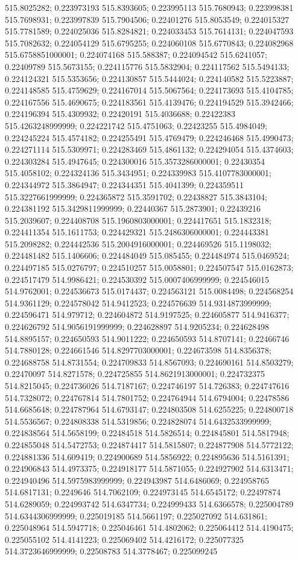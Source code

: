 515.8025282; 0.223973193 515.8393605; 0.223995113 515.7680943; 0.223998381 515.7698931; 0.223997839 515.7904506; 0.22401276 515.8053549; 0.224015327 515.7781589; 0.224025036 515.8284821; 0.224033453 515.7614131; 0.224047593 515.7082632; 0.224054129 515.6795255; 0.224060108 515.6770843; 0.224082968 515.6758851000001; 0.224074168 515.588387; 0.224094542 515.6241057; 0.22409789 515.5673155; 0.224115776 515.5832904; 0.224117562 515.5494133; 0.224124321 515.5353656; 0.224130857 515.5444024; 0.224140582 515.5223887; 0.224148585 515.4759629; 0.224167014 515.5067564; 0.224173693 515.4104785; 0.224167556 515.4690675; 0.224183561 515.4139476; 0.224194529 515.3942466; 0.224196394 515.4309932; 0.22420191 515.4036688; 0.22422383 515.4263248999999; 0.224221742 515.4751063; 0.22423255 515.4984049; 0.224245224 515.4574182; 0.224255491 515.4769479; 0.224246468 515.4990473; 0.224271114 515.5309971; 0.224283469 515.4861132; 0.224294054 515.4374603; 0.224303284 515.4947645; 0.224300016 515.3573286000001; 0.22430354 515.4058102; 0.224324136 515.3434951; 0.224339983 515.4107783000001; 0.224344972 515.3864947; 0.224344351 515.4041399; 0.224359511 515.3227661999999; 0.224365872 515.3591702; 0.22438827 515.3843104; 0.224381192 515.3429811999999; 0.22440367 515.2873901; 0.22439216 515.2039607; 0.224408708 515.1960803000001; 0.224417651 515.1832318; 0.224411354 515.1611753; 0.224429321 515.2486306000001; 0.224443381 515.2098282; 0.224442536 515.2004916000001; 0.224469526 515.1198032; 0.224481482 515.1406606; 0.224484049 515.085455; 0.224484974 515.0469524; 0.224497185 515.0276797; 0.224510257 515.0058801; 0.224507547 515.0162873; 0.224517479 514.9986421; 0.224530392 515.0007406999999; 0.224546015 514.9762001; 0.224536673 515.0174437; 0.224563121 515.0084498; 0.224568254 514.9361129; 0.224578042 514.9412523; 0.224576639 514.9314873999999; 0.224596471 514.979712; 0.224604872 514.9197525; 0.224605877 514.9416377; 0.224626792 514.9056191999999; 0.224628897 514.9205234; 0.224628498 514.8895157; 0.224650593 514.9011222; 0.224650593 514.8707141; 0.22466746 514.7880128; 0.224661546 514.8297703000001; 0.224673598 514.8356378; 0.224688758 514.8731554; 0.224709833 514.8567093; 0.224690161 514.8503279; 0.22470097 514.8271578; 0.224725855 514.8621913000001; 0.224732375 514.8215045; 0.224736026 514.7187167; 0.224746197 514.726383; 0.224747616 514.7328072; 0.224767814 514.7801752; 0.224764944 514.6794004; 0.22478586 514.6685648; 0.224787964 514.6793147; 0.224803508 514.6255225; 0.224800718 514.5536567; 0.224808338 514.5319856; 0.224828074 514.6432533999999; 0.224838564 514.5658199; 0.22484518 514.5826514; 0.224845801 514.5817948; 0.224855048 514.5472753; 0.224874417 514.5815807; 0.224877908 514.5772122; 0.224881336 514.609419; 0.224900689 514.5856922; 0.224895636 514.5161391; 0.224906843 514.4973375; 0.224918177 514.5871055; 0.224927902 514.6313471; 0.224940496 514.5975983999999; 0.224943987 514.6486069; 0.224958765 514.6817131; 0.2249646 514.7062109; 0.224973145 514.6545172; 0.22497874 514.6289059; 0.224993742 514.6347734; 0.224999433 514.6366578; 0.225004789 514.6344306999999; 0.225019185 514.5661197; 0.225027092 514.631861; 0.225048964 514.5947718; 0.225046461 514.4802062; 0.225064412 514.4190475; 0.225055102 514.4141223; 0.225069402 514.4216172; 0.225077325 514.3723646999999; 0.22508783 514.3778467; 0.225099245 